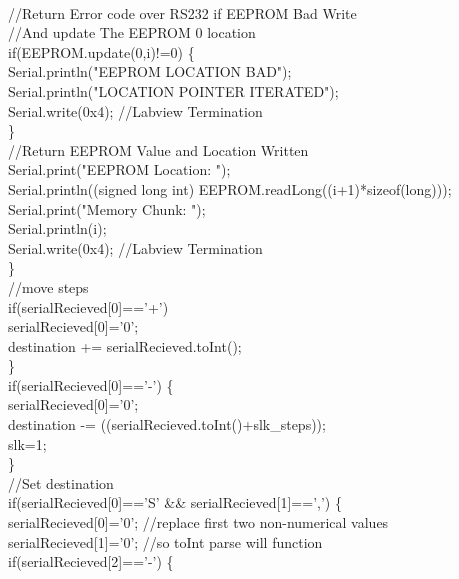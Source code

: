 {{\\	
\tabto*{1cm}//Return Error code over RS232 if EEPROM Bad Write\\
\tabto*{1cm}	//And update The EEPROM 0 location\\
\tabto*{1cm}	if(EEPROM.update(0,i)!=0) \{\\
\tabto*{1.5cm}		Serial.println("EEPROM LOCATION BAD"); \\
\tabto*{1.5cm}		Serial.println("LOCATION POINTER ITERATED");\\
\tabto*{1.5cm}		Serial.write(0x4);  \tabto*{7.5cm}//Labview Termination\\
\tabto*{1cm}	\}\\	
\tabto*{1cm}	//Return EEPROM Value and Location Written\\
\tabto*{1cm}	Serial.print("EEPROM Location: ");\\
\tabto*{1cm}	Serial.println((signed long int) EEPROM.readLong((i+1)*sizeof(long)));\\
\tabto*{1cm}	Serial.print("Memory Chunk: ");\\
\tabto*{1cm}	Serial.println(i);\\
\tabto*{1cm}	Serial.write(0x4); \tabto*{7.5cm} //Labview Termination\\
	\tabto*{.5cm}\}\\
\tabto*{.5cm}//move steps\\
\tabto*{.5cm}if(serialRecieved[0]=='+')\ {\\
\tabto*{1cm}	serialRecieved[0]='0';\\
\tabto*{1cm}	destination += serialRecieved.toInt();\\
\tabto*{.5cm}\}\\
\tabto*{.5cm} if(serialRecieved[0]=='-') \{\\
\tabto*{1cm}	serialRecieved[0]='0';\\
\tabto*{1cm}	destination -= ((serialRecieved.toInt()+slk\_steps));\\
\tabto*{1cm}	slk=1;\\
\tabto*{.5cm}\}\\
\tabto*{.5cm}//Set destination\\
\tabto*{.5cm}if(serialRecieved[0]=='S' \&\& serialRecieved[1]==',') \{\\
\tabto*{1cm}	serialRecieved[0]='0'; \tabto*{7.5cm}//replace first two non-numerical values\\
\tabto*{1cm}	serialRecieved[1]='0';\tabto*{7.5cm} //so toInt parse will function\\
\tabto*{1cm}	if(serialRecieved[2]=='-') \{\\
}}}
